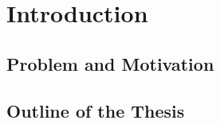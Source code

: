 \chapter{Introduction} %
\label{cha:Introduction}

\section{Problem and Motivation} %
\label{sec:Problem and Motivation}


\section{Outline of the Thesis} %
\label{sec:Outline of the Thesis}


